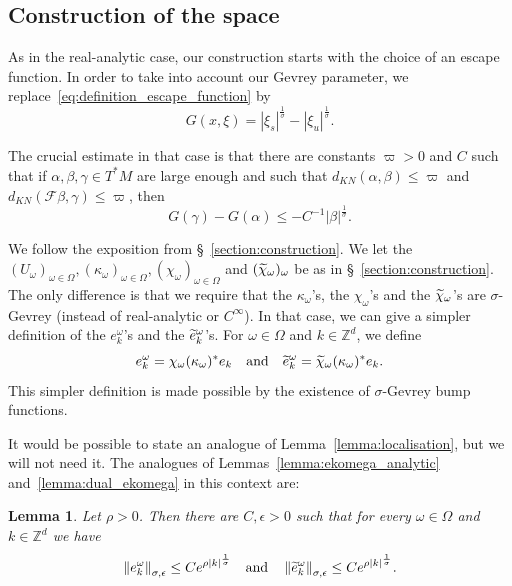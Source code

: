\documentclass[10pt]{amsart}
\newtheorem{lemm}[theo]{Lemma}\newtheorem{prop}[theo]{Proposition}\newtheorem{coro}[theo]{Corollary}\newtheorem{conj}[theo]{Conjecture}
\theoremstyle{definition}\newtheorem{defi}[theo]{Definition}\newtheorem{rema}[theo]{Remark}\newtheorem{exam}[theo]{Example}\newtheorem{exem}[theo]{Example}\newtheorem{nota}[theo]{Notation}
\newcommand{\n}[1]{\left\|#1\right\|}
\newcommand{\va}[1]{\left|#1\right|}
\newcommand{\clF}{\mathcal{F}}
\newcommand{\bbZ}{\mathbb{Z}}
\let\oldtilde\tilde
\renewcommand*{\tilde}[1]{\mathchoice{\widetilde{#1}}{\widetilde{#1}}{\oldtilde{#1}}{\oldtilde{#1}}}
\begin{document}
\subsection{Construction of the space}

As in the real-analytic case, our construction starts with the choice of an escape function. In order to take into account our Gevrey parameter, we replace~\eqref{eq:definition_escape_function} by
\begin{equation*}
G(x,\xi) = \va{\xi_s}^{\frac{1}{\sigma}} - \va{\xi_u}^{\frac{1}{\sigma}}.
\end{equation*}

The crucial estimate in that case is that there are constants $ \varpi > 0$ and $C$ such that if $\alpha,\beta,\gamma \in T^* M$ are large enough and such that $d_{KN}(\alpha,\beta) \leq \varpi$ and $d_{KN}(\clF \beta,\gamma) \leq \varpi$, then
\begin{equation*}
G(\gamma) - G(\alpha) \leq - C^{-1} \va{\beta}^{\frac{1}{\sigma}}.
\end{equation*}

We follow the exposition from \S~\ref{section:construction}. We let the $(U_\omega)_{\omega \in \Omega}, (\kappa_\omega)_{\omega \in \Omega}, (\chi_\omega)_{\omega \in \Omega}$ and $(\tilde{\chi}_\omega)_{\omega}$ be as in \S~\ref{section:construction}. The only difference is that we require that the $\kappa_\omega$'s, the $\chi_\omega$'s and the $\tilde{\chi}_\omega$'s are $\sigma$-Gevrey (instead of real-analytic or $C^\infty$). In that case, we can give a simpler definition of the $e_k^\omega$'s and the $\tilde{e}_k^\omega$'s. For $\omega \in \Omega$ and $k \in \bbZ^d$, we define
\begin{equation*}
e_k^\omega = \chi_\omega (\kappa_\omega)^* e_k \quad \text{and} \quad \tilde{e}_k^\omega = \tilde{\chi}_\omega (\kappa_\omega)^* e_k.
\end{equation*}
This simpler definition is made possible by the existence of $\sigma$-Gevrey bump functions.

It would be possible to state an analogue of Lemma~\ref{lemma:localisation}, but we will not need it. The analogues of Lemmas~\ref{lemma:ekomega_analytic} and~\ref{lemma:dual_ekomega} in this context are:

\begin{lemm}\label{lemma:ekomega_gevrey}
Let $\rho > 0$. Then there are $C,\epsilon > 0$ such that for every $\omega \in \Omega$ and $k \in \bbZ^d$ we have
\begin{equation*}
\n{e_k^\omega}_{\sigma,\epsilon} \leq C e^{\rho \va{k}^{\frac{1}{\sigma}}} \quad \text{and}\quad \n{\tilde{e}_k^\omega}_{\sigma,\epsilon} \leq C e^{\rho \va{k}^{\frac{1}{\sigma}}}.
\end{equation*}
\end{lemm}
\end{document}
